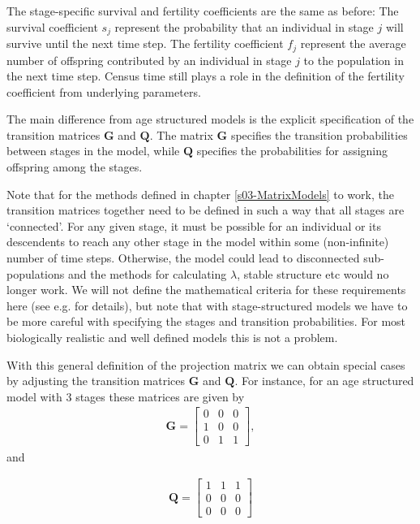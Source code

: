 \documentclass[
]{book}
\begin{document}
The stage-specific survival and fertility coefficients are the same as before: The survival coefficient \(s_j\) represent the probability that an individual in stage \(j\) will survive until the next time step. The fertility coefficient \(f_j\) represent the average number of offspring contributed by an individual in stage \(j\) to the population in the next time step. Census time still plays a role in the definition of the fertility coefficient from underlying parameters.

The main difference from age structured models is the explicit specification of the transition matrices \(\mathbf{G}\) and \(\mathbf{Q}\). The matrix \(\mathbf{G}\) specifies the transition probabilities between stages in the model, while \(\mathbf{Q}\) specifies the probabilities for assigning offspring among the stages.

Note that for the methods defined in chapter \ref{s03-MatrixModels} to work, the transition matrices together need to be defined in such a way that all stages are `connected'. For any given stage, it must be possible for an individual or its descendents to reach any other stage in the model within some (non-infinite) number of time steps. Otherwise, the model could lead to disconnected sub-populations and the methods for calculating \(\lambda\), stable structure etc would no longer work. We will not define the mathematical criteria for these requirements here (see e.g. \citet{Caswell1} for details), but note that with stage-structured models we have to be more careful with specifying the stages and transition probabilities. For most biologically realistic and well defined models this is not a problem.

With this general definition of the projection matrix we can obtain special cases by adjusting the transition matrices \(\mathbf{G}\) and \(\mathbf{Q}\). For instance, for an age structured model with 3 stages these matrices are given by
\begin{align*}
\mathbf{G}=
\left[\begin{matrix} 
0 & 0& 0 \\ 
1 & 0& 0 \\ 
0& 1& 1 
\end{matrix}\right],
\end{align*}
and

\begin{align*}
\mathbf{Q}=
\left[\begin{matrix} 
1 & 1& 1 \\ 
0 & 0& 0 \\ 
0& 0& 0 
\end{matrix}\right]
\end{align*}
\end{document}
